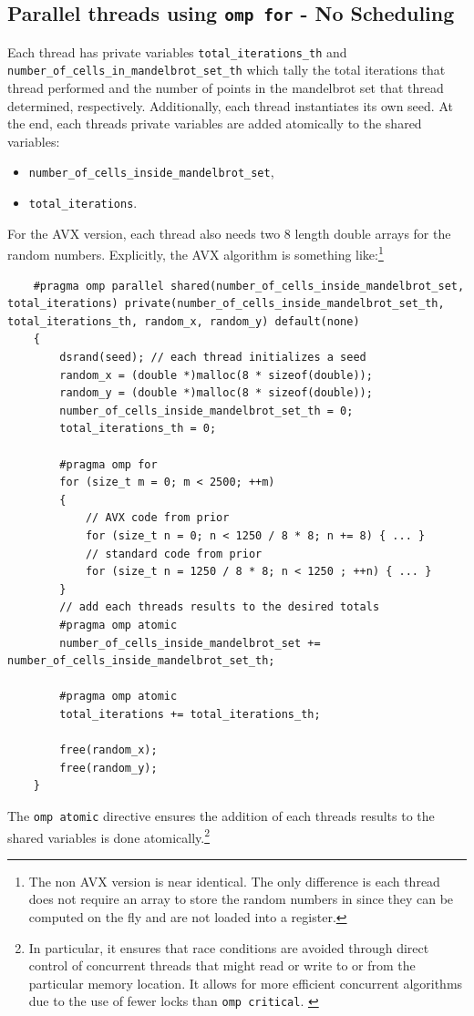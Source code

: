 \documentclass{article}
\newcommand{\MYhref}[3][blue]{\href{#2}{\color{#1}{#3}}}%
\begin{document}
\subsection{Parallel threads using \texttt{omp for} - No Scheduling}
Each thread has private variables \texttt{total\_iterations\_th} and \texttt{number\_of\_cells\_in\_mandelbrot\_set\_th} 
which tally the total iterations that thread performed and the number of points in the mandelbrot set that thread determined, respectively. Additionally, 
each thread instantiates its own seed.
At the end, each threads private variables are added atomically to the shared variables:
\begin{itemize}
    \item \texttt{number\_of\_cells\_inside\_mandelbrot\_set},
    \item \texttt{total\_iterations}.
\end{itemize}
For the AVX version, each thread also needs two 8 length double arrays for the random numbers. Explicitly, the AVX algorithm is something like:\footnote{The non AVX version is 
near identical. The only difference is each thread does not require an array to store the random numbers in since they can be computed on the fly and are not loaded into a register.}
\begin{lstlisting}
    #pragma omp parallel shared(number_of_cells_inside_mandelbrot_set, total_iterations) private(number_of_cells_inside_mandelbrot_set_th, total_iterations_th, random_x, random_y) default(none)
    {
        dsrand(seed); // each thread initializes a seed
        random_x = (double *)malloc(8 * sizeof(double));
        random_y = (double *)malloc(8 * sizeof(double));
        number_of_cells_inside_mandelbrot_set_th = 0;
        total_iterations_th = 0;

        #pragma omp for
        for (size_t m = 0; m < 2500; ++m)
        {
            // AVX code from prior
            for (size_t n = 0; n < 1250 / 8 * 8; n += 8) { ... }
            // standard code from prior
            for (size_t n = 1250 / 8 * 8; n < 1250 ; ++n) { ... }
        }
        // add each threads results to the desired totals
        #pragma omp atomic
        number_of_cells_inside_mandelbrot_set += number_of_cells_inside_mandelbrot_set_th;

        #pragma omp atomic
        total_iterations += total_iterations_th;

        free(random_x);
        free(random_y);
    }
\end{lstlisting}
The \texttt{omp atomic} directive ensures the addition of each threads results to the shared variables is done atomically.\footnote{
    In particular, it ensures that race conditions are avoided through direct control of concurrent threads that might read or write to or from the particular memory location. 
    It allows for more efficient concurrent algorithms due to the use of fewer locks than \texttt{omp critical}. 
    \MYhref{https://www.ibm.com/docs/sk/xl-c-aix/13.1.0?topic=processing-pragma-omp-atomic}{https://www.ibm.com/docs/sk/xl-c-aix/13.1.0?topic=processing-pragma-omp-atomic}
}
\end{document}
